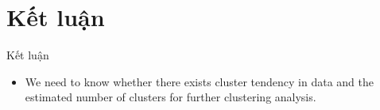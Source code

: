 \section{Kết luận}\label{sec:intro}
\frame{\tableofcontents[currentsection]}
\begin{frame}{Kết luận}

\begin{itemize}
    \item <1-> We need to know whether there exists cluster tendency in data and the estimated number of clusters for further clustering analysis.
\end{itemize}
\end{frame}
